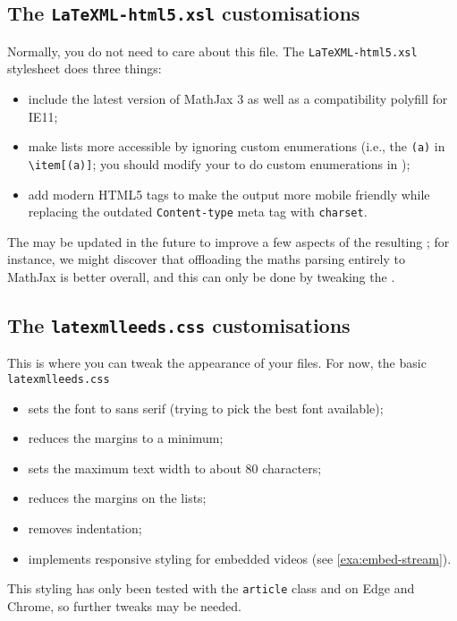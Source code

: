 \documentclass[a4paper]{article}
\def\ltxinline{\lstinline[style=latexml,frame=none]}
\theoremstyle{definition}
\begin{document}
\subsection{The \texttt{LaTeXML-html5.xsl} customisations}
\label{sub:xslt}
Normally, you do not need to care about this file. The \verb|LaTeXML-html5.xsl| \XSLT{} stylesheet does three things:
\begin{itemize}
  \item include the latest version of MathJax 3 as well as a compatibility polyfill for IE11;
  \item make \HTML{} lists more accessible by ignoring custom enumerations (i.e., the \ltxinline|(a)| in \ltxinline|\item[(a)]|; you should modify your \CSS{} to do custom enumerations in \HTML{});
  \item add modern HTML5 tags to make the output more mobile friendly while replacing the outdated \verb|Content-type| meta tag with \verb|charset|.
\end{itemize}
The \XSLT{} may be updated in the future to improve a few aspects of the resulting \HTML{}; for instance, we might discover that offloading the maths parsing entirely to MathJax is better overall, and this can only be done by tweaking the \XSLT{}.

\subsection{The \texttt{latexmlleeds.css} customisations}
\label{sub:css}
This is where you can tweak the appearance of your \HTML{} files. For now, the basic \verb|latexmlleeds.css|
\begin{itemize}
  \item sets the font to sans serif (trying to pick the best font available);
  \item reduces the margins to a minimum;
  \item sets the maximum text width to about 80 characters;
  \item reduces the margins on the lists;
  \item removes indentation;
  \item implements responsive styling for embedded videos (see \autoref{exa:embed-stream}).
\end{itemize}
This styling has only been tested with the \verb|article| class and on Edge and Chrome, so further tweaks may be needed.

\appendix
\end{document}
